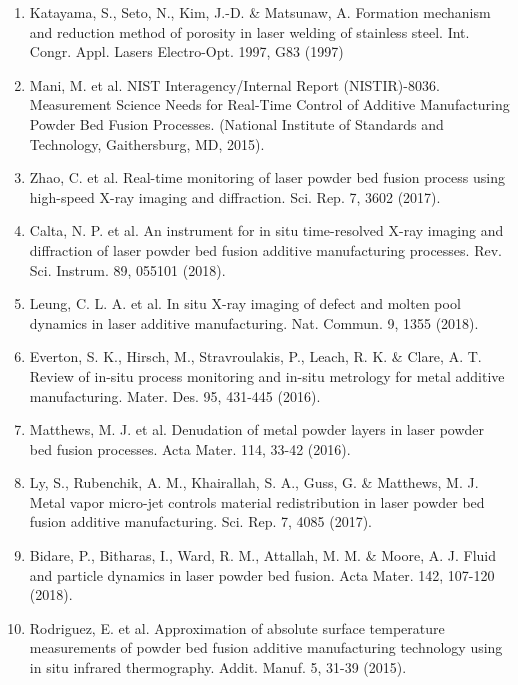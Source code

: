 \documentclass[10pt]{article}
\begin{document}
\begin{enumerate}
  \item Katayama, S., Seto, N., Kim, J.-D. \& Matsunaw, A. Formation mechanism and reduction method of porosity in laser welding of stainless steel. Int. Congr. Appl. Lasers Electro-Opt. 1997, G83 (1997)

  \item Mani, M. et al. NIST Interagency/Internal Report (NISTIR)-8036. Measurement Science Needs for Real-Time Control of Additive Manufacturing Powder Bed Fusion Processes. (National Institute of Standards and Technology, Gaithersburg, MD, 2015).

  \item Zhao, C. et al. Real-time monitoring of laser powder bed fusion process using high-speed X-ray imaging and diffraction. Sci. Rep. 7, 3602 (2017).

  \item Calta, N. P. et al. An instrument for in situ time-resolved X-ray imaging and diffraction of laser powder bed fusion additive manufacturing processes. Rev. Sci. Instrum. 89, 055101 (2018).

  \item Leung, C. L. A. et al. In situ X-ray imaging of defect and molten pool dynamics in laser additive manufacturing. Nat. Commun. 9, 1355 (2018).

  \item Everton, S. K., Hirsch, M., Stravroulakis, P., Leach, R. K. \& Clare, A. T. Review of in-situ process monitoring and in-situ metrology for metal additive manufacturing. Mater. Des. 95, 431-445 (2016).

  \item Matthews, M. J. et al. Denudation of metal powder layers in laser powder bed fusion processes. Acta Mater. 114, 33-42 (2016).

  \item Ly, S., Rubenchik, A. M., Khairallah, S. A., Guss, G. \& Matthews, M. J. Metal vapor micro-jet controls material redistribution in laser powder bed fusion additive manufacturing. Sci. Rep. 7, 4085 (2017).

  \item Bidare, P., Bitharas, I., Ward, R. M., Attallah, M. M. \& Moore, A. J. Fluid and particle dynamics in laser powder bed fusion. Acta Mater. 142, 107-120 (2018).

  \item Rodriguez, E. et al. Approximation of absolute surface temperature measurements of powder bed fusion additive manufacturing technology using in situ infrared thermography. Addit. Manuf. 5, 31-39 (2015).


\end{enumerate}
\end{document}
